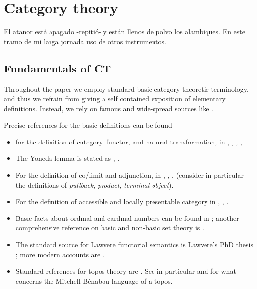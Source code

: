 \section{Category theory}
\epigraph{El atanor está apagado -repitió- y están llenos de polvo los alambiques. En este tramo
	de mi larga jornada uso de otros instrumentos.}{\cite{arena}}
\subsection{Fundamentals of CT}
Throughout the paper we employ standard basic category-theoretic terminology, and thus we refrain from giving a self contained exposition of elementary definitions. Instead, we rely on famous and wide-spread sources like \cite{Bor1,Bor2,McL,riehlcontext,leinster2014basic,simmons2011introduction}.

Precise references for the basic definitions can be found
\begin{itemize}
	\item for the definition of category, functor, and natural transformation, in \cite[1.2.1]{Bor1}, \cite[I.2]{McL}, \cite[1.2.2]{Bor1}, \cite[I.3]{McL}, \cite[1.3.1]{Bor1}.
	\item The Yoneda lemma is stated as \cite[1.3.3]{Bor1}, \cite[III.2]{McL}.
	\item For the definition of co/limit and adjunction, in \cite[2.6.2]{Bor1}, \cite[III.3]{McL}, \cite[2.6.6]{Bor1}, \cite[III.4]{McL} (consider in particular the definitions of \emph{pullback}, \emph{product}, \emph{terminal object}).
	\item For the definition of accessible and locally presentable category in \cite[5.3.1]{Bor2}, \cite[5.2.1]{Bor2}, \cite{Adamek1994}.%
	\item Basic facts about ordinal and cardinal numbers can be found in \cite{kunen}; another comprehensive reference on basic and non-basic set theory is \cite{jech2013set}.
	\item The standard source for Lawvere functorial semantics is Lawvere's PhD thesis \cite{lawvere1963functorial}; more modern accounts are \cite{hyland2007category}.
	\item Standard references for topos theory are \cite{mac1992sheaves,JohnstonePT}. See in particular \cite[VI.5]{mac1992sheaves} and \cite[5.4]{JohnstonePT} for what concerns the Mitchell-Bénabou language of a topos.
\end{itemize}
